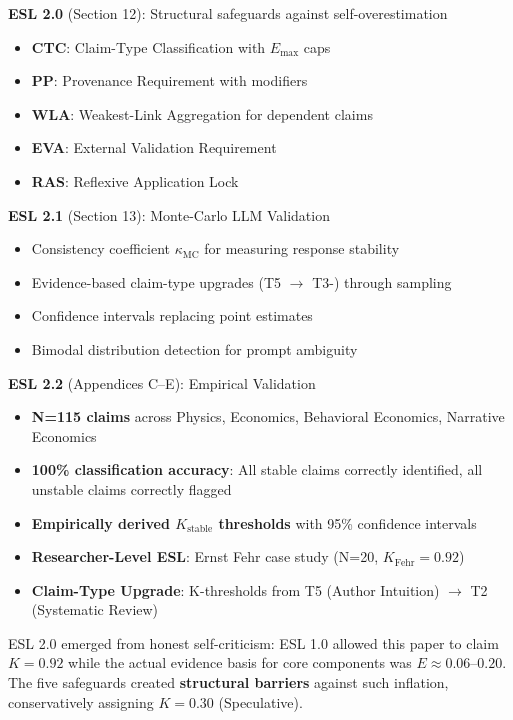 \documentclass[11pt,a4paper]{article}
\begin{document}
\textbf{ESL 2.0} (Section 12): Structural safeguards against self-overestimation
\begin{itemize}
    \item \textbf{CTC}: Claim-Type Classification with $E_{\max}$ caps
    \item \textbf{PP}: Provenance Requirement with modifiers
    \item \textbf{WLA}: Weakest-Link Aggregation for dependent claims
    \item \textbf{EVA}: External Validation Requirement
    \item \textbf{RAS}: Reflexive Application Lock
\end{itemize}

\textbf{ESL 2.1} (Section 13): Monte-Carlo LLM Validation
\begin{itemize}
    \item Consistency coefficient $\kappa_{\text{MC}}$ for measuring response stability
    \item Evidence-based claim-type upgrades (T5 $\to$ T3-) through sampling
    \item Confidence intervals replacing point estimates
    \item Bimodal distribution detection for prompt ambiguity
\end{itemize}

\textbf{ESL 2.2} (Appendices C--E): Empirical Validation
\begin{itemize}
    \item \textbf{N=115 claims} across Physics, Economics, Behavioral Economics, Narrative Economics
    \item \textbf{100\% classification accuracy}: All stable claims correctly identified, all unstable claims correctly flagged
    \item \textbf{Empirically derived $K_{\text{stable}}$ thresholds} with 95\% confidence intervals
    \item \textbf{Researcher-Level ESL}: Ernst Fehr case study (N=20, $K_{\text{Fehr}} = 0.92$)
    \item \textbf{Claim-Type Upgrade}: K-thresholds from T5 (Author Intuition) $\to$ T2 (Systematic Review)
\end{itemize}

ESL 2.0 emerged from honest self-criticism: ESL 1.0 allowed this paper to claim $K = 0.92$ while the actual evidence basis for core components was $E \approx 0.06$--$0.20$. The five safeguards created \textbf{structural barriers} against such inflation, conservatively assigning $K = 0.30$ (Speculative).
\end{document}
